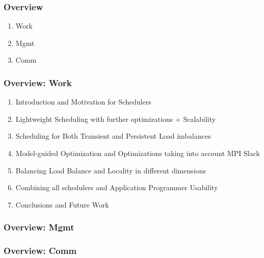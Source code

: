 



\begin{frame}
\frametitle{Overview}
\begin{enumerate} 
\item Work 
\item Mgmt
\item Comm 
\end{enumerate}
\end{frame} 






\begin{frame}
\frametitle{Overview: Work}
\begin{enumerate}
\item Introduction and Motivation for Schedulers
\item Lightweight Scheduling with further optimizations + Scalability 
\item Scheduling for Both Transient and Persistent Load imbalances
\item Model-guided Optimization and Optimizations taking into account MPI Slack
\item Balancing Load Balance and Locality in different dimensions
\item Combining all schedulers and Application Programmer Usability
\item Conclusions and Future Work
\end{enumerate}
\end{frame}




\begin{frame}
\frametitle{Overview: Mgmt} 

\end{frame} 

\begin{frame}
\frametitle{Overview: Comm} 


\end{frame} 









